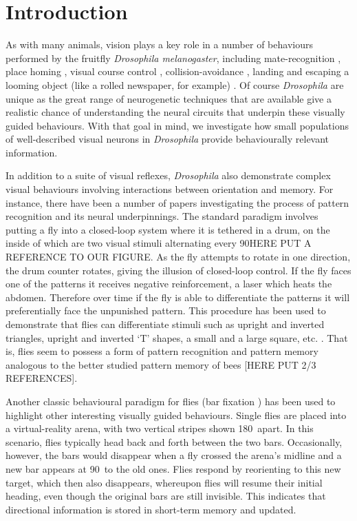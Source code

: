 \section*{Introduction}
As with many animals, vision plays a key role in a number of behaviours performed by the fruitfly \emph{Drosophila melanogaster}, including mate-recognition \cite{Agrawal2014}, place homing \cite{Ofstad2011}, visual course control \cite{Borst2014}, collision-avoidance \cite{Tammero2002}, landing \cite{Tammero2002} and escaping a looming object (like a rolled newspaper, for example) \cite{Card2008}.
Of course \emph{Drosophila} are unique as the great range of neurogenetic techniques that are available give a realistic chance of understanding the neural circuits that underpin these visually guided behaviours. With that goal in mind, we investigate how small populations of well-described visual neurons in \emph{Drosophila} provide behaviourally relevant information.

In addition to a suite of visual reflexes, \emph{Drosophila} also demonstrate complex visual behaviours involving interactions between orientation and memory.
For instance, there have been a number of papers investigating the process of pattern recognition and its neural underpinnings\cite{Pan2009,Liu2006,Ernst1999}.
The standard paradigm involves putting a fly into a closed-loop system where it is tethered in a drum, on the inside of which are two visual stimuli alternating every 90\degree HERE PUT A REFERENCE TO OUR FIGURE. As the fly attempts to rotate in one direction, the drum counter rotates, giving the illusion of closed-loop control. If the fly faces one of the patterns it receives negative reinforcement, a laser which heats the abdomen. Therefore over time if the fly is able to differentiate the patterns it will preferentially face the unpunished pattern. This procedure has been used to demonstrate that flies can differentiate stimuli such as upright and inverted triangles, upright and inverted `T' shapes, a small and a large square, etc. \cite{Ernst1999}. That is, flies seem to possess a form of pattern recognition and pattern memory analogous to the better studied pattern memory of bees [HERE PUT 2/3 REFERENCES].

Another classic behavioural paradigm for flies (bar fixation \cite{Neuser2008}) has been used to highlight other interesting visually guided behaviours.
Single flies are placed into a virtual-reality arena, with two vertical stripes shown 180\degree\ apart.
In this scenario, flies typically head back and forth between the two bars.
Occasionally, however, the bars would disappear when a fly crossed the arena's midline and a new bar appears at 90\degree\ to the old ones.
Flies respond by reorienting to this new target, which then also disappears, whereupon flies will resume their initial heading, even though the original bars are still invisible. This indicates that directional information is stored in short-term memory and updated.

